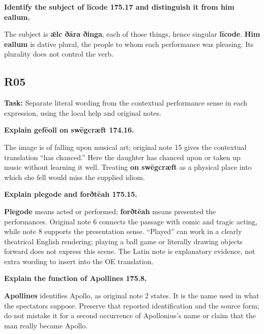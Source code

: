 \textbf{Identify the subject of līcode 175.17 and distinguish it from him eallum.}

The subject is \textbf{ǣlc ðāra ðinga}, each of those things, hence singular \textbf{līcode}. \textbf{Him eallum} is dative plural, the people to whom each performance was pleasing. Its plurality does not control the verb.

\subsection*{R05}

\textbf{Task:} Separate literal wording from the contextual performance sense in each expression, using the local help and original notes.

\textbf{Explain gefēoll on swēgcræft 174.16.}

The image is of falling upon musical art; original note 15 gives the contextual translation “has chanced.” Here the daughter has chanced upon or taken up music without learning it well. Treating \textbf{on swēgcræft} as a physical place into which she fell would miss the supplied idiom.

\textbf{Explain plegode and forðtēah 175.15.}

\textbf{Plegode} means acted or performed; \textbf{forðtēah} means presented the performances. Original note 6 connects the passage with comic and tragic acting, while note 8 supports the presentation sense. “Played” can work in a clearly theatrical English rendering; playing a ball game or literally drawing objects forward does not express this scene. The Latin note is explanatory evidence, not extra wording to insert into the OE translation.

\par\begin{minipage}{\linewidth}\raggedright
\textbf{Explain the function of Apollines 175.8.}

\textbf{Apollines} identifies Apollo, as original note 2 states. It is the name used in what the spectators suppose. Preserve that reported identification and the source form; do not mistake it for a second occurrence of Apollonius's name or claim that the man really became Apollo.
\end{minipage}\par


